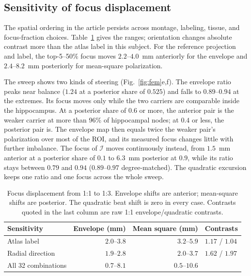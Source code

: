 \documentclass[11pt,a4paper]{article}
\providecommand{\DIFaddtex}[1]{{\protect\color{blue} \sf #1}} %
\providecommand{\DIFadd}[1]{\texorpdfstring{\DIFaddtex{#1}}{#1}} %
\begin{document}
\subsection{\DIFadd{Sensitivity of focus displacement}}\label{supp:fem-sensitivities}
\DIFadd{The spatial ordering in the article persists across montage, labeling, tissue,
and focus-fraction choices. Table~\ref{tab:fem-sensitivities} gives the ranges;
orientation changes absolute contrast more than the atlas label in this subject.
For the reference projection and label, the top-5--50\% focus moves
$2.2$--$4.0$~mm anteriorly for the envelope and $2.4$--$8.2$~mm posteriorly
for mean-square polarization.
}

\DIFadd{The sweep shows two kinds of steering (Fig.~\ref{fig:fem}e,f). The envelope ratio peaks
near balance ($1.24$ at a posterior share of $0.525$) and falls to $0.89$--$0.94$ at
the extremes. Its focus moves only while the two carriers are comparable inside the
hippocampus. At a posterior share of $0.6$ or more, the anterior pair is the weaker
carrier at more than 96\% of hippocampal nodes; at $0.4$ or less, the posterior pair is. The
envelope map then equals twice the weaker pair's polarization over most of the ROI,
and its measured focus changes little with further imbalance. The focus of $\mathcal I$ moves
continuously instead, from $1.5$~mm anterior at a posterior share of $0.1$ to $6.3$~mm
posterior at $0.9$, while its ratio stays between $0.79$ and $0.94$ ($0.89$--$0.97$
degree-matched). The quadratic excursion keeps one ratio and one focus across the
whole sweep.
}

\begin{table}[htbp]
\color{blue}\centering\small
\caption{\color{blue}Focus displacement from 1:1 to 1:3. Envelope shifts are anterior;
mean-square shifts are posterior. The quadratic beat shift is zero in every case.
Contrasts quoted in the last column are raw 1:1 envelope/quadratic contrasts.}
\label{tab:fem-sensitivities}
\begin{tabular}{@{}lrrl@{}}
\toprule
Sensitivity & Envelope (mm) & Mean square (mm) & Contrasts\\
\midrule
Atlas label & $2.0$--$3.8$ & $3.2$--$5.9$ & $1.17$ / $1.04$\\
Radial direction & $1.9$--$2.8$ & $2.0$--$3.7$ & $1.62$ / $1.97$\\
All 32 combinations & $0.7$--$8.1$ & $0.5$--$10.6$ & \\
\bottomrule
\end{tabular}
\end{table}
\end{document}
